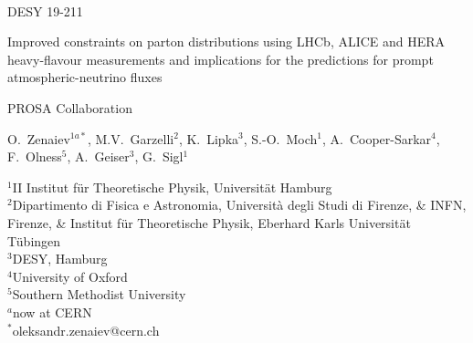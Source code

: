 \documentclass[12pt]{article}
\begin{document}
\begin{titlepage}
\noindent
\\
DESY 19-211 %
\\

\vspace{1.0cm}

\begin{center}
  {\bf 

\large

Improved constraints on parton distributions using LHCb, ALICE and HERA heavy-flavour measurements and implications for the predictions for prompt atmospheric-neutrino fluxes 
  }
  \vspace{1.0cm}

  {\large
    PROSA Collaboration
  }\\

  \vspace{0.4cm}

\end{center}
\noindent
O.~Zenaiev$^{1a*}$, \mbox{M.V.~Garzelli}$^{2}$, K.~Lipka$^{3}$, \mbox{S.-O.~Moch}$^{1}$, A.~Cooper-Sarkar$^{4}$, F.~Olness$^{5}$, A.~Geiser$^{3}$, G.~Sigl$^{1}$\\


\noindent


{\footnotesize{
		\noindent
		$^{1}$II Institut f\"ur Theoretische Physik, Universit\"at Hamburg\\
		$^{2}$Dipartimento di Fisica e Astronomia, Universit\`a degli Studi di Firenze, \& INFN, Firenze, \& Institut f\"ur Theoretische Physik, Eberhard Karls Universit\"at T\"ubingen\\
		$^{3}${DESY, Hamburg}\\
		$^{4}$University of Oxford\\
		$^{5}$Southern Methodist University\\
		$^{a}$now at CERN\\
    
    \noindent
		$^{*}$oleksandr.zenaiev@cern.ch\\
	}
}


\end{titlepage}
\end{document}
